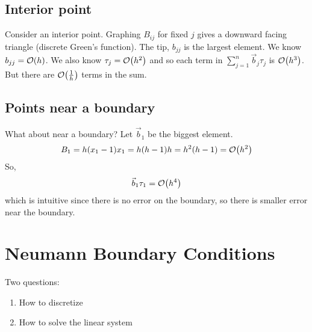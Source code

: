 \documentclass{article}
\begin{document}
        \subsection{Interior point}
            Consider an interior point.  Graphing $B_{ij}$ for fixed $j$ gives a downward facing triangle (discrete Green's function).  The tip, $b_{jj}$ is the largest element.  We know $b_{jj} = \order{h}$.  We also know $\tau_j = \order{h^2}$ and so each term in $\sum_{j=1}^n \vec{b}_j \tau_j$ is $\order{h^3}$.  But there are $\order{\frac{1}{h}}$ terms in the sum. \\

        \subsection{Points near a boundary}
            What about near a boundary?  Let $\vec{b}_1$ be the biggest element.
            \begin{align}
                B_1 = h(x_1-1)x_1 = h(h-1)h = h^2(h-1) = \order{h^2}
            \end{align}
            So,
            \begin{align}
                \vec{b}_1\tau_1 = \order{h^4}
            \end{align}
            which is intuitive since there is no error on the boundary, so there is smaller error near the boundary.

    \section{Neumann Boundary Conditions}
        Two questions:
        \begin{enumerate}
                \item How to discretize
                \item How to solve the linear system
        \end{enumerate}
\end{document}
